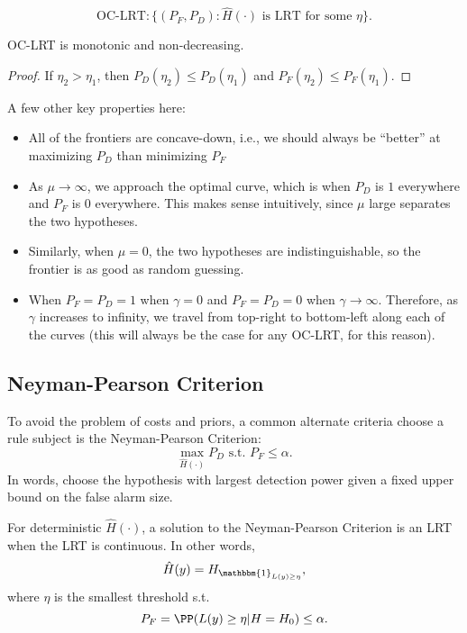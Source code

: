 \[\text{OC-LRT}: \{(P_F, P_D): \hat{H}(\cdot)\text{ is LRT for some }\eta\}.\] 

\begin{theorem}
\claimlabel

OC-LRT is monotonic and non-decreasing. 
\end{theorem}

\begin{proof}
If $\eta_2 > \eta_1$, then $P_D(\eta_2)\leq P_D(\eta_1)$ and $P_F(\eta_2)\leq P_F(\eta_1)$.
\end{proof}
\noindent A few other key properties here: 
\begin{itemize}
	\item All of the frontiers are concave-down, i.e., we should always be ``better'' at maximizing $P_D$ than minimizing $P_F$
	\item As $\mu\rightarrow \infty$, we approach the optimal curve, which is when $P_D$ is $1$ everywhere and $P_F$ is $0$ everywhere. This makes sense intuitively, since $\mu$ large separates the two hypotheses. 
	\item Similarly, when $\mu = 0$, the two hypotheses are indistinguishable, so the frontier is as good as random guessing. 
	\item When $P_F = P_D = 1$ when $\gamma = 0$ and $P_F = P_D = 0$ when $\gamma\rightarrow \infty$. Therefore, as $\gamma$ increases to infinity, we travel from top-right to bottom-left along each of the curves (this will always be the case for any OC-LRT, for this reason). 
\end{itemize}

\subsection{Neyman-Pearson Criterion}

To avoid the problem of costs and priors, a common alternate criteria choose a rule subject is the \ac{Neyman-Pearson Criterion}: 
\[\max_{\hat{H}(\cdot)}P_D \text{ s.t. }P_F\leq \alpha.\] 
In words, choose the hypothesis with largest detection power given a fixed upper bound on the false alarm size.
\begin{theorem}

For deterministic $\hat{H}(\cdot)$, a solution to the Neyman-Pearson Criterion is an LRT when the LRT is continuous. In other words, 
\[\hat{H}(y) = H_{\mathbbm{1}_{L(y)\geq \eta}},\] 
where $\eta$ is the smallest threshold s.t. 
\[P_F = \PP(L(y)\geq \eta | H=H_0)\leq \alpha.\] 
\end{theorem}

